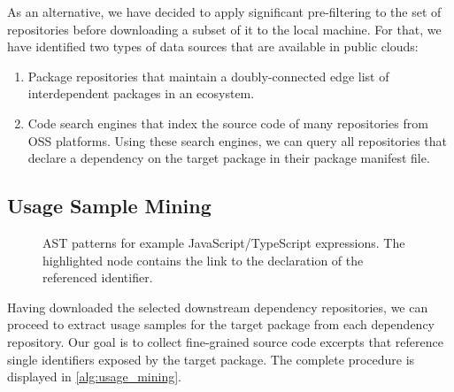 As an alternative, we have decided to apply significant pre-filtering to the set of repositories before downloading a subset of it to the local machine.
For that, we have identified two types of data sources that are available in public clouds:

\begin{enumerate}[label=(\roman*)]
	\item Package repositories that maintain a doubly-connected edge list of interdependent packages in an ecosystem.
	\item Code search engines that index the source code of many repositories from OSS platforms.
		Using these search engines, we can query all repositories that declare a dependency on the target package in their package manifest file.
\end{enumerate}

\subsection{Usage Sample Mining}
\label{sec:approach/usage_mining}

\begin{figure*}
	\begin{minipage}{\linewidth}
		\newcommand\textlowlight[1]{\textcolor{gray}{#1}}
		\newcommand\texthighlight[1]{\textcolor{accent1}{#1}}
		\begin{center}
			\begin{subfigure}[t]{.32\linewidth}
				
			\end{subfigure}
			\hfill
			\begin{subfigure}[t]{.32\linewidth}
				
			\end{subfigure}
			\hfill
			\begin{subfigure}[t]{.32\linewidth}
				
			\end{subfigure}

			\caption{AST patterns for example JavaScript/TypeScript expressions.
				The \texthighlight{highlighted} node contains the link to the declaration of the referenced identifier.
			}
			\label{fig:approach/usage_mining/patterns}
		\end{center}
	\end{minipage}
\end{figure*}

Having downloaded the selected downstream dependency repositories, we can proceed to extract usage samples for the target package from each dependency repository.
Our goal is to collect fine-grained source code excerpts that reference single identifiers exposed by the target package.
The complete procedure is displayed in \cref{alg:usage_mining}.

